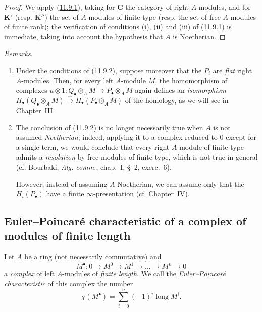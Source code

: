 \begin{proof}
We apply (\hyperref[0.11.9.1]{11.9.1}), taking for $\boldsymbol{C}$ the
category of right $A$-modules, and for $\boldsymbol{K}'$ (resp. $\boldsymbol{K}''$) the set of
$A$-modules of finite type (resp. the set of free $A$-modules of finite
rank); the verification of conditions (i), (ii) and (iii) of
(\hyperref[0.11.9.1]{11.9.1}) is immediate, taking into account the
hypothesis that $A$ is Noetherian.
\end{proof}

\begin{env}[11.9.3]
\label{0.11.9.3}
\emph{Remarks}.
\begin{enumerate}
\item[{\rm(i)}] Under the conditions of
(\hyperref[0.11.9.2]{11.9.2}), suppose moreover that the $P_i$ are \emph{flat}
right $A$-modules. Then, for every left $A$-module $M$,
the homomorphism of complexes $u\otimes 1:Q_\bullet\otimes_A M\to P_\bullet\otimes_A M$
again defines an \emph{isomorphism}
$H_\bullet(Q_\bullet\otimes_A M)\xrightarrow{\sim}
H_\bullet(P_\bullet\otimes_A M)$ of the homology, as we will see in
Chapter~III.
\item[{\rm(ii)}] The conclusion of (\hyperref[0.11.9.2]{11.9.2}) is no
longer necessarily true when $A$ is not assumed \emph{Noetherian}; indeed,
applying it to a complex reduced to $0$ except for a single term, we would
conclude that every right $A$-module of finite type admits a \emph{resolution}
by free modules of finite type, which is not true in general
(cf. Bourbaki, \emph{Alg. comm.}, chap.~I, \S~2, exerc.~6).

However, instead of assuming $A$ Noetherian, we can assume only that
the $H_i(P_\bullet)$ have a finite $\infty$-presentation (cf. Chapter~IV).
\end{enumerate}
\end{env}

\subsection{Euler--Poincaré characteristic of a complex of modules of
finite length}
\label{subsection:0.11.10}

\begin{env}[11.10.1]
\label{0.11.10.1}
Let $A$ be a ring (not necessarily commutative) and
\[
\label{0.11.10.1.1}
\tag{11.10.1.1}
M^\bullet:0\longrightarrow M^0\longrightarrow M^1
\longrightarrow\ldots\longrightarrow M^n\longrightarrow0
\]
a \emph{complex} of left $A$-modules of \emph{finite length}. We call the
\emph{Euler--Poincaré characteristic} of this complex the number
\[
\label{0.11.10.1.2}
\tag{11.10.1.2}
\chi(M^\bullet)=\sum_{i=0}^{n}(-1)^i\operatorname{long}M^i.
\]
\end{env}

